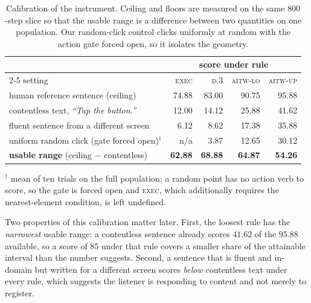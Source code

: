 \documentclass[runningheads,a4paper]{llncs}
\newcommand{\rulename}[1]{\textsc{#1}}
\begin{document}
\begin{table}[t]
\centering
\caption{Calibration of the instrument. Ceiling and floors are measured on the same $800$-step
slice so that the usable range is a difference between two quantities on one population. Our
random-click control clicks uniformly at random with the action gate forced open, so it isolates
the geometry.}
\label{tab:cal}
\small
\begin{tabular}{lrrrr}
\toprule
& \multicolumn{4}{c}{score under rule}\\
\cmidrule(l){2-5}
setting & \rulename{exec} & \rulename{d.3} & \rulename{aitw-lo} & \rulename{aitw-up}\\
\midrule
human reference sentence (ceiling) & 74.88 & 83.00 & 90.75 & 95.88\\
\midrule
contentless text, \emph{``Tap the button.''} & 12.00 & 14.12 & 25.88 & 41.62\\
fluent sentence from a different screen & \phantom{0}6.12 & \phantom{0}8.62 & 17.38 & 35.88\\
uniform random click (gate forced open)$^{\dagger}$ & n/a &
\phantom{0}3.87 & 12.65 & 30.12\\
\midrule
\textbf{usable range} (ceiling $-$ contentless) & \textbf{62.88} & \textbf{68.88} &
\textbf{64.87} & \textbf{54.26}\\
\bottomrule
\end{tabular}\par
\vspace{2pt}
{\footnotesize\raggedright $^{\dagger}$ mean of ten trials on the full population; a random point has no
action verb to score, so the gate is forced open and \rulename{exec}, which additionally requires
the nearest-element condition, is left undefined.\par}
\end{table}

Two properties of this calibration matter later. First, the loosest rule has the \emph{narrowest}
usable range: a contentless sentence already scores $41.62$ of the $95.88$ available, so a score of
$85$ under that rule covers a smaller share of the attainable interval than the number suggests.
Second, a sentence that is fluent and in-domain but written for a different screen scores \emph{below}
contentless text under every rule, which suggests the listener is responding to content and not
merely to register.
\end{document}
